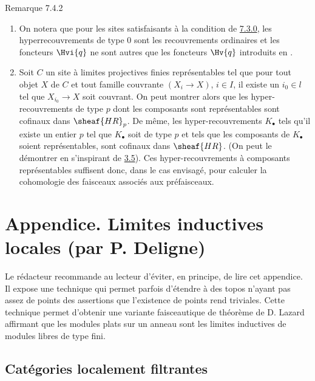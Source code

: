 \begin{enonce*}[remark]{Remarque 7.4.2}
\begin{enumerate}
\renewcommand{\labelenumi}{\theenumi)}
\item On notera que pour les sites satisfaisants à la condition de
  \hyperref[V.subsubsec7.3.0]{7.3.0}, les hyperrecouvrements de type 0 sont les recouvrements
  ordinaires et les foncteurs
  $\Hvi{q}$ ne sont autres que les
  foncteurs $\Hv{q}$ introduits en .

\item Soit $C$ un site à limites projectives finies représentables
  tel que pour tout objet $X$ de $C$ et tout famille couvrante $(X_i
  \to X)$, $i \in I$, il existe un $i_{0} \in l$ tel que
  $X_{i_{0}} \to X$ soit couvrant. On peut montrer alors que les
  hyper-recouvrements de type $p$ dont les composants sont
  représentables sont cofinaux dans $\sheaf{HR}_p$. De même, les
  hyper-recouvrements $K_∙$ tels qu'il existe un entier $p$ tel que
  $K_∙$ soit de type $p$ et tels que les composants de $K_∙$ soient
  représentables, sont cofinaux dans \pageoriginale $\sheaf{HR}$. (On peut
  le démontrer en s'inspirant de \hyperref[V.cor3.5]{3.5}). Ces
  hyper-recouvrements à
  composants représentables suffisent donc, dans le cas envisagé,
  pour calculer la cohomologie des faisceaux associés aux
  préfaisceaux.
\end{enumerate}
\end{enonce*}

\section{Appendice. Limites inductives locales (par P. Deligne)}

Le rédacteur recommande au lecteur d'éviter, en principe, de lire
cet appendice. Il expose une technique qui permet parfois d'étendre
à des topos n'ayant pas assez de points des assertions que
l'existence de points rend triviales. Cette technique permet d'obtenir
une variante faisceautique de théorème de D. Lazard affirmant que
les modules plats sur un anneau sont les limites inductives de modules
libres de type fini.

\subsection{Catégories localement filtrantes}

